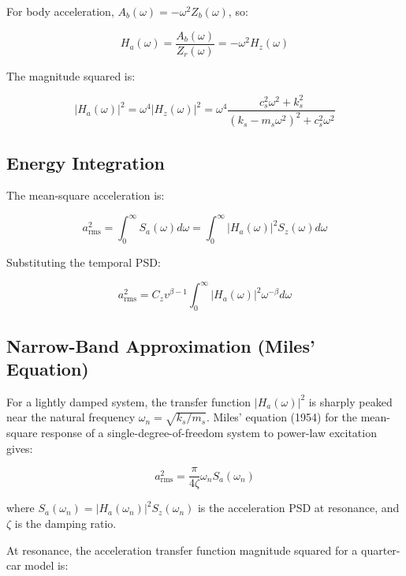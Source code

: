 \documentclass[11pt,letterpaper]{article}
\begin{document}
For body acceleration, $A_b(\omega) = -\omega^2 Z_b(\omega)$, so:

\begin{equation}
H_a(\omega) = \frac{A_b(\omega)}{Z_r(\omega)} = -\omega^2 H_z(\omega)
\end{equation}

The magnitude squared is:

\begin{equation}
|H_a(\omega)|^2 = \omega^4 |H_z(\omega)|^2 = \omega^4 \frac{c_s^2 \omega^2 + k_s^2}{(k_s - m_s \omega^2)^2 + c_s^2 \omega^2}
\end{equation}

\subsection{Energy Integration}

The mean-square acceleration is:

\begin{equation}
a_{\text{rms}}^2 = \int_0^\infty S_a(\omega) d\omega = \int_0^\infty |H_a(\omega)|^2 S_z(\omega) d\omega
\end{equation}

Substituting the temporal PSD:

\begin{equation}
a_{\text{rms}}^2 = C_z v^{\beta-1} \int_0^\infty |H_a(\omega)|^2 \omega^{-\beta} d\omega
\end{equation}

\subsection{Narrow-Band Approximation (Miles' Equation)}

For a lightly damped system, the transfer function $|H_a(\omega)|^2$ is sharply peaked near the natural frequency $\omega_n = \sqrt{k_s/m_s}$. Miles' equation (1954) for the mean-square response of a single-degree-of-freedom system to power-law excitation gives:

\begin{equation}
a_{\text{rms}}^2 = \frac{\pi}{4\zeta} \omega_n S_a(\omega_n)
\end{equation}

where $S_a(\omega_n) = |H_a(\omega_n)|^2 S_z(\omega_n)$ is the acceleration PSD at resonance, and $\zeta$ is the damping ratio.

At resonance, the acceleration transfer function magnitude squared for a quarter-car model is:
\end{document}
